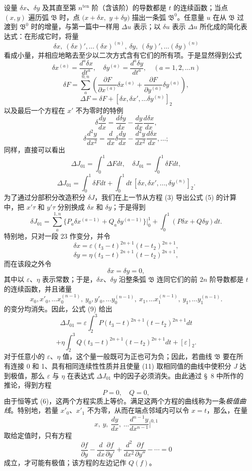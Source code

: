 \documentclass[11pt,a4paper,leqno]{article}
\begin{document}
设量 $\delta x$、$\delta y$ 及其直至第 $n^{\mathrm{ten}}$ 阶（含该阶）的导数都是 $t$ 的连续函数；当点 $(x,y)$ 遍历弧 $\mathfrak B$ 时，点 $(x+\delta x,$
$y+\delta y)$ 描出一条弧 $\mathfrak B^0$。任意量 $u$ 在从 $\mathfrak B$ 过渡到 $\mathfrak B^0$ 时的增量，与第一篇中一样用 $\Delta u$ 表示；以 $\delta u$ 表示 $\Delta u$ 所化成的简化表达式：在形成它时，将量
\[
\delta x,\ (\delta x)',\ldots (\delta x)^{(n)},\ \delta y,\ (\delta y)',\ldots (\delta y)^{(n)}
\]
看成小量，并相应地略去至少以二次方式含有它们的所有项。于是显然得到公式
\[
\delta x^{(a)}=\frac{d^a\delta x}{dt^a},\quad
\delta y^{(a)}=\frac{d^a\delta y}{dt^a},\quad (a=1,2,\ldots n)
\]
\[
\delta F=\sum_a^{0,n}\left(\frac{\partial F}{\partial x^{(a)}}\delta x^{(a)}+\frac{\partial F}{\partial y^{(a)}}\delta y^{(a)}\right),
\]
\[
\Delta F=\delta F+[\delta x,\delta x',\ldots \delta y^{(n)}]_2
\]
以及最后一个方程在 $x'$ 不为零时的特例
\[
\delta\frac{dy}{dx}=\frac{d\delta y}{dx}-\frac{dy}{dx}\frac{d\delta x}{dx},
\]
\[
\delta\frac{d^2y}{dx^2}=\frac{d}{dx}\delta\frac{dy}{dx}-\frac{d^2y}{dx^2}\frac{d\delta x}{dx},\ldots;
\]
同样，直接可以看出
\[
\Delta J_{01}=\int_0^1\Delta Fdt,
\quad
\delta J_{01}=\int_0^1\delta Fdt,
\]
\begin{equation}\tag{9}
\Delta J_{01}=\int_0^1\delta Fdt+\int_0^1dt\,[\delta x,\delta x',\ldots,\delta y^{(n)}]_2.
\end{equation}
为了通过分部积分改造积分 $\delta J$，我们在上一节从方程 (3) 导出公式 (5) 的计算中，把 $x'\tau$ 和 $y'\tau$ 分别换成 $\delta x$ 和 $\delta y$；于是得到
\begin{equation}\tag{10}
\delta J_{01}=\sum_a^{1,n}\{P_a\delta x^{(a-1)}+Q_a\delta y^{(a-1)}\}\bigg|_0^1
+\int_0^1(P\delta x+Q\delta y)dt.
\end{equation}
特别地，只对一段 23 作变分，并令
\[
\delta x=\varepsilon(t_3-t)^{2n+1}(t-t_2)^{2n+1},
\]
\[
\delta y=\eta(t_3-t)^{2n+1}(t-t_2)^{2n+1},
\]
而在该段之外令
\[
\delta x=\delta y=0,
\]
其中以 $\varepsilon$、$\eta$ 表示常数；于是，$\delta x$、$\delta y$ 沿整条弧 $\mathfrak B$ 连同它们的前 $2n$ 阶导数都是 $t$ 的连续函数，并且诸量
\begin{equation}\tag{11}
 x_0,x'_0,\ldots x_0^{(n-1)},\ y_0,y'_0,\ldots y_0^{(n-1)},\ x_1,\ldots x_1^{(n-1)},\ y_1,\ldots y_1^{(n-1)}.
\end{equation}
的变分均消失。因此，公式 (9) 给出
\[
\Delta J_{01}=\varepsilon\int_2^3P(t_3-t)^{2n+1}(t-t_2)^{2n+1}dt
\]
\[
+\eta\int_2^3Q(t_3-t)^{2n+1}(t-t_2)^{2n+1}dt+[\varepsilon]_2.
\]
对于任意小的 $\varepsilon$、$\eta$ 值，这个量一般既可为正也可为负；因此，若曲线 $\mathfrak B$ 要在所有连接 0 和 1、具有相同连续性性质并且使量 (11) 取相同值的曲线中使积分 $J$ 达到极值，那么 $\varepsilon$ 与 $\eta$ 在表达式 $\Delta J_{01}$ 中的因子必须消失。由此通过 \S~8 中所作的推论，得到方程
\[
P=0,\quad Q=0,
\]
由于恒等式 (6)，这两个方程实质上等价。满足这两个方程的曲线称为一条\emph{极值曲线}。特别地，若量 $x'_0$、$x'_1$ 不为零，从而在端点邻域内可以令 $x=t$，那么，在量
\[
x,\ y,\ \frac{dy}{dx},\ \ldots \frac{d^{n-1}y}{dx^{n-1}}\bigg|^{0,1}
\]
取给定值时，只有方程
\[
\frac{\partial f}{\partial y}-\frac{d}{dx}\frac{\partial f}{\partial y'}+\frac{d^2}{dx^2}\frac{\partial f}{\partial y''}-\cdots=0
\]
成立，才可能有极值；该方程的左边记作 $Q(f)$。
\end{document}
